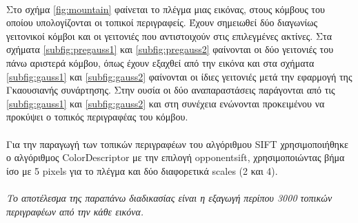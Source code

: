 \paragraph*{}
Στο σχήμα \ref{fig:mountain} φαίνεται το πλέγμα μιας εικόνας, στους κόμβους του οποίου υπολογίζονται οι τοπικοί περιγραφείς. Έχουν σημειωθεί δύο διαγωνίως γειτονικοί κόμβοι και οι γειτονιές που αντιστοιχούν στις επιλεγμένες ακτίνες. Στα σχήματα \ref{subfig:pregauss1} και \ref{subfig:pregauss2} φαίνονται οι δύο γειτονιές του πάνω αριστερά κόμβου, όπως έχουν εξαχθεί από την εικόνα και στα σχήματα \ref{subfig:gauss1} και \ref{subfig:gauss2} φαίνονται οι ίδιες γειτονιές μετά την εφαρμογή της Γκαουσιανής συνάρτησης. Στην ουσία οι δύο αναπαραστάσεις παράγονται από τις \ref{subfig:gauss1} και \ref{subfig:gauss2} και στη συνέχεια ενώνονται προκειμένου να προκύψει ο τοπικός περιγραφέας του κόμβου.

\paragraph*{}
Για την παραγωγή των τοπικών περιγραφέων του αλγόριθμου SIFT χρησιμοποιήθηκε ο αλγόριθμος ColorDescriptor \cite{vandeSandeTPAMI2010} με την επιλογή opponentsift, χρησιμοποιώντας βήμα ίσο με 5 pixels για το πλέγμα και δύο διαφορετικά scales (2 και 4).

\paragraph*{}
\textit{Το αποτέλεσμα της παραπάνω διαδικασίας είναι η εξαγωγή περίπου 3000 τοπικών περιγραφέων από την κάθε εικόνα.}

